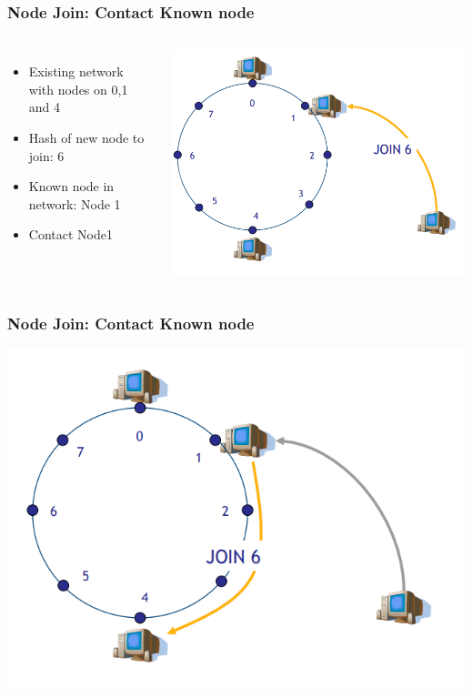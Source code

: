 \begin{frame}
    \frametitle{Node Join: Contact Known node}
    \begin{columns}
        \begin{itemize}
            \item Existing network with nodes on 0,1 and 4
            \item Hash of new node to join: 6
            \item Known node in network: Node 1
            \item Contact Node1
        \end{itemize}
            \includegraphics[scale=0.26]{figures/chord1.png}
    \end{columns}
\end{frame}

\begin{frame}
    \frametitle{Node Join: Contact Known node}
    \includegraphics[scale=0.3]{figures/chord2.png}
\end{frame}

